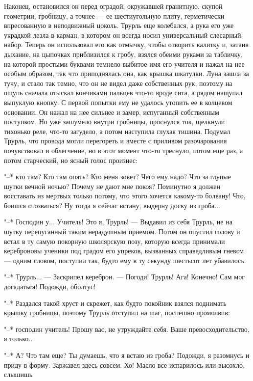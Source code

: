 Наконец, остановился он перед оградой, окружавшей
гранитную, скупой геометрии, гробницу, а точнее --- ее
шестиугольную плиту, герметически впресованную в неподвижный
цоколь. Трурль еще колебался, а рука его уже украдкой лезла
в карман, в котором он всегда носил универсальный слесарный
набор. Теперь он использовал его как отмычку, чтобы отворить
калитку и, затаив дыхание, на цыпочках приблизился к гробу,
взялся обеими руками за табличку, на которой простыми
буквами темнело выбитое имя его учителя и нажал на нее
особым образом, так что приподнялась она, как крышка
шкатулки. Луна зашла за тучу, и стало так темно, что он не
видел даже собственных рук, поэтому на ощупь сначала отыскал
кончиками пальцев что-то вроде сита, а рядом нащупал
выпуклую кнопку. С первой попытки ему не удалось утопить ее
в колцевом основании. Он нажал на нее сильнее и замер,
испуганный собственным поступком. Но уже зашумело внутри
гробницы, проснулся ток, щелкнули тихонько реле, что-то
загудело, а потом наступила глухая тишина. Подумал Трурль,
что провода могли перегореть и вместе с приливом
разочарования почувствовал и облегчение, но в этот момент
что-то треснуло, потом еще раз, а потом старческий, но ясный
голос произнес:

"--* кто там? Кто там опять? Кто меня зовет? Чего ему надо?
Что за глупые шутки вечной ночью? Почему не дают мне покоя?
Поминутно я должен восставать из мертвых только потому, что
этого хочется какому-то болвану! Что, боишся отозваться? Ну
тогда я сейчас встану, выдерну доску из гроба...

"--* Господин у... Учитель! Это я, Трурль! --- Выдавил из
себя Трурль, не на шутку перепуганный таким нерадушным
приемом. Потом он опустил голову и встал в ту самую покорную
школярскую позу, которую всегда принимали кереброновы
ученики под градом его упреков, вызванных справедливым
гневом --- одним словом, поступил так, будто ему в ту секунду
шестьсот лет убавилось.

"--* Трурль... --- Заскрипел кереброн. --- Погоди! Трурль!
Ага! Конечно! Сам мог догадаться! Подожди, оболтус!

"--* Раздался такой хруст и скрежет, как будто покойник
взялся поднимать крышку гробницы, поэтому Трурль отступил на
шаг, поспешно промолвив:

"--* господин учитель! Прошу вас, не утруждайте себя. Ваше
превосходительство, я только..

"--* А? Что там еще? Ты думаешь, что я встаю из гроба?
Подожди, я разомнусь и приду в форму. Заржавел здесь совсем.
Хо! Масло все испарилось или высохло, слышишь

